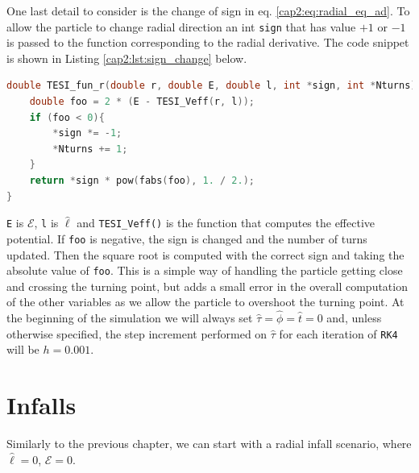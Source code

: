 One last detail to consider is the change of sign in eq.
\ref{cap2:eq:radial_eq_ad}.
To allow the particle to change radial direction an int \texttt{sign} that has
value $+1$ or $-1$ is passed to the function corresponding to the radial
derivative.
The code snippet is shown in Listing \ref{cap2:lst:sign_change} below.

\begin{lstlisting}[language=C, label=cap2:lst:sign_change, caption=Function to compute the radial derivative]
double TESI_fun_r(double r, double E, double l, int *sign, int *Nturns){
    double foo = 2 * (E - TESI_Veff(r, l));
    if (foo < 0){
        *sign *= -1;
        *Nturns += 1;
    }
    return *sign * pow(fabs(foo), 1. / 2.);
}
\end{lstlisting}

\texttt{E} is $\mathcal E$, \texttt{l} is $\hat \ell$ and \texttt{TESI\_Veff()} is
the function that computes the effective potential.
If \texttt{foo} is negative, the sign is changed and the number of turns
updated.
Then the square root is computed with the correct sign and taking the absolute
value of \texttt{foo}.
This is a simple way of handling the particle getting close and crossing the
turning point, but adds a small error in the overall computation of the other
variables as we allow the particle to overshoot the turning point.
At the beginning of the simulation we will always set
$\hat \tau = \hat \phi = \hat t = 0$ and, unless otherwise specified, the step
increment performed on $\hat \tau$ for each iteration of \texttt{RK4} will be
$h = 0.001$.


\section{Infalls}

Similarly to the previous chapter, we can start with a radial infall scenario,
where $\hat \ell = 0$, $\mathcal E = 0$.

